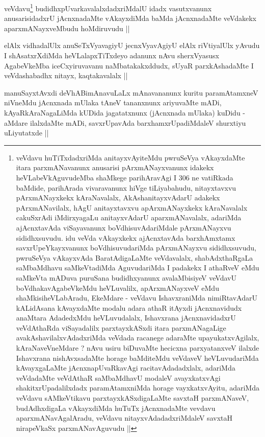 \begin{artha}
veVdavu\footnote[1]{veVdavu huTiTxdadxriMda anitayxvAyiteMdu pwruSeVya vAkayxdaMte itara parxmANavanunx anusarisi pArxmANayxvanunx idakekx heVLabeVkAguvudeMba shaMkege parihAravAgi I 306 ne vatiRkada baMdide, parihArada vivaravanunx hiVge tiLiyabahudu, nitayxtavxvu pArxmANayxkekx kAraNavalalx, AkAshanitayxvAdarU adakekx pArxmANavilalx, hAgU anitayxtavxvu apArxmANayxkekx kAraNavalalx cakuSxrAdi iMdirxyagaLu anitayxvAdarU aparxmANavalalx, adariMda ajAcnxtavAda viSayavanunx boVdhisuvAdariMdale pArxmANayxvu sididhxsuvudu. idu veVda vAkayxkekx ajAcnxtavAda barxhAmxtamx savxrUpeYkayxvanunx boVdhisuvudariMda pArxmANayxvu sididhxsuvudu, pwruSeVya vAkayxvAda BaratAdigaLaMte veVdavalalx, shabAdxthaRgaLa saMbaMdhavu saMkeVtadiMda AguvudariMda I padakekx I athaRveV eMdu saMkeVta mADuva puruSana budidhxyanunx avalaMbisiyeV veVdavU boVdhakavAgabeVkeMdu heVLuvalilx, apArxmANayxveV eMdu shaMkisiheVLabAradu, EkeMdare - veVdavu IshavxraniMda nimiRtavAdarU kALidAsana kAvayxdaMte modalu adara athaR itAyxdi jAcnxnavidudx anaMtara AdadedxMdu heVLuvudalalx, Ishavxrana jAcnxnavidadxrU veVdAthaRda viSayadalilx parxtayxkASxdi itara parxmANagaLige avakAshavilalxvAdadxriMda veVdada racanege adaraMte upayukatxvAgilalx, kAraNaveVneMdare ? nAvu usiru biDuvaMte hecicxna parxyatanxveV ilalxde Ishavxrana nishAvxsadaMte horage baMditeMdu veVdaveV heVLuvudariMda kAvayxgaLaMte jAcnxnapUvaRkavAgi racitavAdadadxlalx, adariMda veVdadaMte veVdAthaR saMbaMdhavU modaleV avayxkatxvAgi shakitxrUpadalilxdadx paramAtamxniMda horage vayxkatxvAyitu, adariMda veVdavu sAMkeVtikavu parxtayxkASxdigaLaMte savxtaH parxmANaveV, budAdhxdigaLa vAkayxdiMda huTuTx jAcnxnadaMte vevdavu aparxmANavAgalAradu, veVdavu nitayxvAdadadxriMdaleV savxtaH nirapeVkaSx parxmANavAguvudu ||} budidhxpUvarkavalalxdadxriMdalU idadx vasutxvanunx anusarisidadxrU jAcnxnadaMte vAkayxdiMda baMda jAcnxnadaMte veVdakekx aparxmANayxveMbudu hoMdiruvudu ||
\end{artha}

\begin{artha}
elAlx vidhadalUlx anuSeTxVyavagiyU jecnxVyavAgiyU elAlx riVtiyalUlx yAvudu I shAsatxrXdiMda heVLalapxTiTxdeyo adanunx nAvu sherxVyasusx AgabeVkeMba iceCxyiruvavanu naMbatakakxddudx, \footnotemark[2]sUyaR parxkAshadaMte I veVdashabadhx nitayx, kaqtakavalalx || 
\end{artha}

\begin{artha}
manuSayxtAvxdi deVhABimAnavuLaLx mAnavananunx kuritu paramAtamxneV niVneMdu jAcnxnada mUlaka tAneV tananxnunx ariyuvaMte mADi, kAyaRkAraNagaLiMda kUDida jagatatxnunx (jAcnxnada mUlaka) kuDidu - aMdare ilalxdaMte mADi, savxrUpavAda barxhamxrUpadiMdaleV shurxtiyu uLiyutatxde ||
\end{artha}

